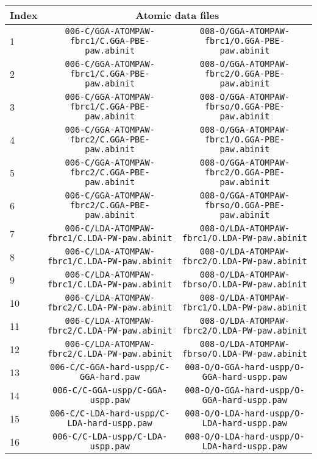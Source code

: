 \documentclass[onecolumn]{revtex4}
\begin{document}
\begin{center}
\begin{tabular}{lcc}
\hline
Index & \multicolumn{2}{c}{Atomic data files} \\
\hline
1 & \verb?006-C/GGA-ATOMPAW-fbrc1/C.GGA-PBE-paw.abinit? & \verb?008-O/GGA-ATOMPAW-fbrc1/O.GGA-PBE-paw.abinit? \\
2 & \verb?006-C/GGA-ATOMPAW-fbrc1/C.GGA-PBE-paw.abinit? & \verb?008-O/GGA-ATOMPAW-fbrc2/O.GGA-PBE-paw.abinit? \\
3 & \verb?006-C/GGA-ATOMPAW-fbrc1/C.GGA-PBE-paw.abinit? & \verb?008-O/GGA-ATOMPAW-fbrso/O.GGA-PBE-paw.abinit? \\
4 & \verb?006-C/GGA-ATOMPAW-fbrc2/C.GGA-PBE-paw.abinit? & \verb?008-O/GGA-ATOMPAW-fbrc1/O.GGA-PBE-paw.abinit? \\
5 & \verb?006-C/GGA-ATOMPAW-fbrc2/C.GGA-PBE-paw.abinit? & \verb?008-O/GGA-ATOMPAW-fbrc2/O.GGA-PBE-paw.abinit? \\
6 & \verb?006-C/GGA-ATOMPAW-fbrc2/C.GGA-PBE-paw.abinit? & \verb?008-O/GGA-ATOMPAW-fbrso/O.GGA-PBE-paw.abinit? \\
7 & \verb?006-C/LDA-ATOMPAW-fbrc1/C.LDA-PW-paw.abinit? & \verb?008-O/LDA-ATOMPAW-fbrc1/O.LDA-PW-paw.abinit? \\
8 & \verb?006-C/LDA-ATOMPAW-fbrc1/C.LDA-PW-paw.abinit? & \verb?008-O/LDA-ATOMPAW-fbrc2/O.LDA-PW-paw.abinit? \\
9 & \verb?006-C/LDA-ATOMPAW-fbrc1/C.LDA-PW-paw.abinit? & \verb?008-O/LDA-ATOMPAW-fbrso/O.LDA-PW-paw.abinit? \\
10 & \verb?006-C/LDA-ATOMPAW-fbrc2/C.LDA-PW-paw.abinit? & \verb?008-O/LDA-ATOMPAW-fbrc1/O.LDA-PW-paw.abinit? \\
11 & \verb?006-C/LDA-ATOMPAW-fbrc2/C.LDA-PW-paw.abinit? & \verb?008-O/LDA-ATOMPAW-fbrc2/O.LDA-PW-paw.abinit? \\
12 & \verb?006-C/LDA-ATOMPAW-fbrc2/C.LDA-PW-paw.abinit? & \verb?008-O/LDA-ATOMPAW-fbrso/O.LDA-PW-paw.abinit? \\
13 & \verb?006-C/C-GGA-hard-uspp/C-GGA-hard.paw? & \verb?008-O/O-GGA-hard-uspp/O-GGA-hard-uspp.paw? \\
14 & \verb?006-C/C-GGA-uspp/C-GGA-uspp.paw? & \verb?008-O/O-GGA-hard-uspp/O-GGA-hard-uspp.paw? \\
15 & \verb?006-C/C-LDA-hard-uspp/C-LDA-hard-uspp.paw? & \verb?008-O/O-LDA-hard-uspp/O-LDA-hard-uspp.paw? \\
16 & \verb?006-C/C-LDA-uspp/C-LDA-uspp.paw? & \verb?008-O/O-LDA-hard-uspp/O-LDA-hard-uspp.paw? \\
\hline
\end{tabular}
\end{center}
\end{document}
